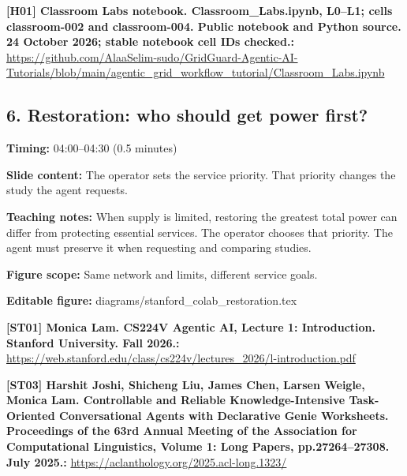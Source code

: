 \documentclass[10pt,letterpaper]{article}
\begin{document}
\textbf{[H01] Classroom Labs notebook. Classroom\_Labs.ipynb, L0--L1; cells classroom-002 and classroom-004. Public notebook and Python source. 24 October 2026; stable notebook cell IDs checked.:} \href{https://github.com/AlaaSelim-sudo/GridGuard-Agentic-AI-Tutorials/blob/main/agentic_grid_workflow_tutorial/Classroom_Labs.ipynb}{\small\ttfamily https:/\allowbreak{}/\allowbreak{}github.\allowbreak{}com/\allowbreak{}AlaaSelim-\allowbreak{}sudo/\allowbreak{}GridGuard-\allowbreak{}Agentic-\allowbreak{}AI-\allowbreak{}Tutorials/\allowbreak{}blob/\allowbreak{}main/\allowbreak{}agentic\_\allowbreak{}grid\_\allowbreak{}workflow\_\allowbreak{}tutorial/\allowbreak{}Classroom\_\allowbreak{}Labs.\allowbreak{}ipynb}\par
\par\medskip
\subsection*{6. Restoration: who should get power first?}
\textbf{Timing:} 04:00--04:30 (0.5 minutes)\par
\textbf{Slide content:} The operator sets the service priority.
That priority changes the study the agent requests.\par
\textbf{Teaching notes:} When supply is limited, restoring the greatest total power can differ from protecting essential services. The operator chooses that priority. The agent must preserve it when requesting and comparing studies.\par
\textbf{Figure scope:} Same network and limits, different service goals.\par
\textbf{Editable figure:} diagrams/stanford\_colab\_restoration.tex\par
\textbf{[ST01] Monica Lam. CS224V Agentic AI, Lecture 1: Introduction. Stanford University. Fall 2026.:} \href{https://web.stanford.edu/class/cs224v/lectures_2026/l-introduction.pdf}{\small\ttfamily https:/\allowbreak{}/\allowbreak{}web.\allowbreak{}stanford.\allowbreak{}edu/\allowbreak{}class/\allowbreak{}cs224v/\allowbreak{}lectures\_\allowbreak{}2026/\allowbreak{}l-\allowbreak{}introduction.\allowbreak{}pdf}\par
\textbf{[ST03] Harshit Joshi, Shicheng Liu, James Chen, Larsen Weigle, Monica Lam. Controllable and Reliable Knowledge-Intensive Task-Oriented Conversational Agents with Declarative Genie Worksheets. Proceedings of the 63rd Annual Meeting of the Association for Computational Linguistics, Volume 1: Long Papers, pp.27264--27308. July 2025.:} \href{https://aclanthology.org/2025.acl-long.1323/}{\small\ttfamily https:/\allowbreak{}/\allowbreak{}aclanthology.\allowbreak{}org/\allowbreak{}2025.\allowbreak{}acl-\allowbreak{}long.\allowbreak{}1323/\allowbreak{}}\par
\end{document}
